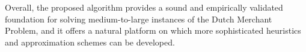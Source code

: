 \documentclass[12pt]{article}
\begin{document}
Overall, the proposed algorithm provides a sound and empirically validated foundation for solving medium-to-large instances of the Dutch Merchant Problem, and it offers a natural platform on which more sophisticated heuristics and approximation schemes can be developed.



\end{document}
